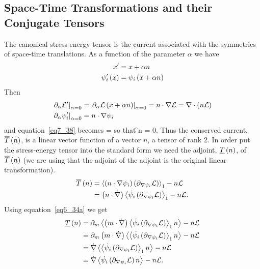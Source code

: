 \subsection{Space-Time Transformations and their Conjugate Tensors}
The canonical stress-energy tensor is the current associated with the symmetries of space-time translations. As a function of the parameter $\alpha$
we have
\begin{align}
	x' &= x+\alpha n \\
	{\psi'_{i}}\left ( {x} \right ) &= {\psi_{i}}\left ( {x+\alpha n} \right )
\end{align}
Then
\begin{align}
	\left . {\partial_{\alpha}\mathcal{L}'} \right |_{\alpha=0} &= \left . {\partial_{\alpha}{\mathcal{L}}\left ( {x+\alpha n} \right )} \right |_{\alpha=0} = n\cdot\nabla\mathcal{L} = \nabla\cdot\left ( {n\mathcal{L}} \right )\\
	\left . {\partial_{\alpha}\psi'_{i}} \right |_{\alpha=0} &= n\cdot\nabla\psi_{i}
\end{align}
and equation~\ref{eq7_38} becomes
\be
 	\nabla\cdot{} = \nabla\cdot{}
\ee
so that
\be
	\nabla\cdot\f{}{n} \equiv \nabla\cdot{} = 0. \label{eq7_47}
\ee
Thus the conserved current, ${\overline{T}}\left ( {n} \right )$, is a linear vector function of a vector $n$, a tensor of rank 2.  In order put the stress-energy tensor
into the standard form we need the adjoint, ${\underline{T}}\left ( {n} \right )$, of ${\overline{T}}\left ( {n} \right )$ (we are using that the adjoint of the adjoint is the original
linear transformation). 
\begin{align}
	{\overline{T}}\left ( {n} \right ) &= \left \langle {\left ({n\cdot\nabla\psi_{i}} \right )\left ({\partial_{\nabla\psi_{i}}\mathcal{L}} \right )} \right \rangle_{1}-n\mathcal{L} \\
	                    &= \left ( {n\cdot\dot{\nabla}} \right )\left \langle {\dot{\psi_{i}}\left ({\partial_{\nabla\psi_{i}}\mathcal{L}} \right )} \right \rangle_{1}-n\mathcal{L}.
\end{align}
Using equation~\ref{eq6_34a} we get
\begin{align}
	{\underline{T}}\left ( {n} \right ) &= \partial_{m}\left \langle {\left ({m\cdot\dot{\nabla}} \right )\left \langle {\dot{\psi_{i}}\left ({\partial_{\nabla\psi_{i}}\mathcal{L}} \right )} \right \rangle_{1}n} \right \rangle_{}-n\mathcal{L} \nonumber \\
	         &= \partial_{m}\left ( {m\cdot\dot{\nabla}} \right )\left \langle {\left \langle {\dot{\psi_{i}}\left ({\partial_{\nabla\psi_{i}}\mathcal{L}} \right )} \right \rangle_{1}n} \right \rangle_{}-n\mathcal{L} \nonumber \\
	         &= \dot{\nabla}\left \langle {\left \langle {\dot{\psi_{i}}\left ({\partial_{\nabla\psi_{i}}\mathcal{L}} \right )} \right \rangle_{1}n} \right \rangle_{}-n\mathcal{L} \nonumber \\
	         &= \dot{\nabla}\left \langle {\dot{\psi_{i}}\left ({\partial_{\nabla\psi_{i}}\mathcal{L}} \right )n} \right \rangle_{}-n\mathcal{L}. \label{eq7_70}
\end{align}
